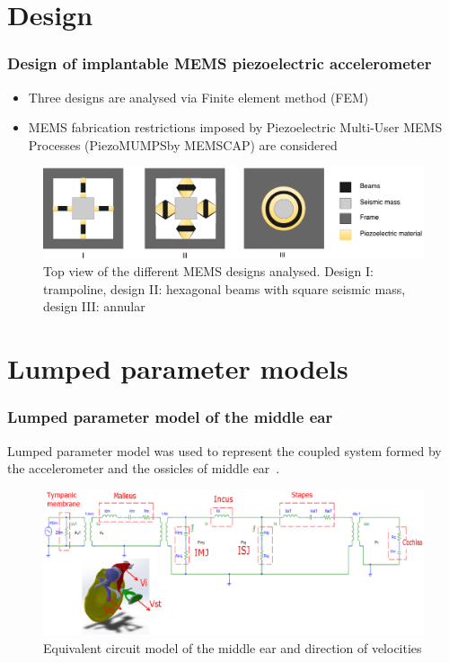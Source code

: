 \documentclass[dvipsnames,12pt]{beamer}
\begin{document}
\section{Design}
\begin{frame}
\frametitle{Design of implantable MEMS piezoelectric accelerometer}
\begin{itemize}
    \item Three designs are analysed via Finite element method (FEM)
    \item MEMS fabrication restrictions imposed by Piezoelectric Multi-User MEMS Processes (PiezoMUMPS\texttrademark by MEMSCAP\textregistered) are considered
\end{itemize}

  \begin{figure}[ht!]
  \centering
\includegraphics [width=1\textwidth]{Figures/Figure1.pdf}
\caption{Top view of the different MEMS designs analysed. Design I: trampoline, design II: hexagonal beams with square seismic mass, design III: annular}
\end{figure}
\end{frame}

\section{Lumped parameter models}
\begin{frame}
\frametitle{Lumped parameter model of the middle ear}
    Lumped parameter model was used to represent the coupled system formed by the accelerometer and the ossicles of middle ear~\cite{oconnor2008}.
    \vskip-0.5cm
\begin{figure}[!ht]
\centering
\includegraphics [width=1.05\textwidth]{Figures/Figure2.eps}
\caption{Equivalent circuit model of the middle ear and direction of velocities}
\label{fig:CE_OM3}
\end{figure}
\end{frame}
\end{document}
